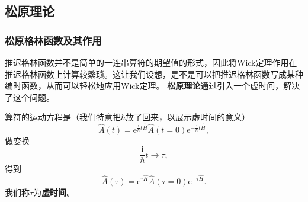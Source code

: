 \documentclass[hyperref, UTF8, a4paper]{ctexart}
\newcommand*{\ii}{\mathrm{i}}
\newcommand*{\ee}{\mathrm{e}}
\begin{document}
\subsection{松原理论}\label{sec:matsubara-theory}

\subsubsection{松原格林函数及其作用}

推迟格林函数并不是简单的一连串算符的期望值的形式，因此将Wick定理作用在推迟格林函数上计算较繁琐。这让我们设想，是不是可以把推迟格林函数写成某种编时函数，从而可以轻松地应用Wick定理。
\textbf{松原理论}通过引入一个虚时间，解决了这个问题。

算符的运动方程是（我们特意把$\hbar$放了回来，以展示虚时间的意义）
\[
    \hat{A}(t) = \ee^{\frac{\ii}{\hbar} t \hat{H}} \hat{A}(t=0) \ee^{-\frac{\ii}{\hbar} t \hat{H}},
\]
做变换
\begin{equation}
    \frac{\ii}{\hbar} t \longrightarrow \tau,
\end{equation}
得到
\begin{equation}
    \hat{A}(\tau) = \ee^{\tau \hat{H}} \hat{A}(\tau=0) \ee^{-\tau \hat{H}}.
\end{equation}
我们称$\tau$为\textbf{虚时间}。
\end{document}
